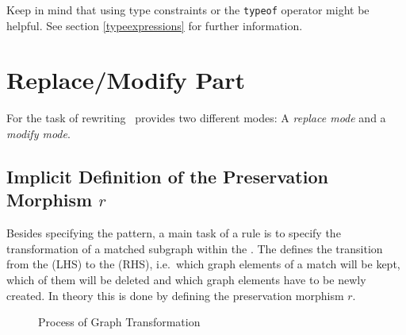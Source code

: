 Keep in mind that using type constraints or the \texttt{typeof} operator might be helpful. See section \ref{typeexpressions} for further information.

\section{Replace/Modify Part}
\label{replacepart}
For the task of rewriting \GrG\ provides two different modes: A \emph{replace mode} and a \emph{modify mode}.

\subsection{Implicit Definition of the Preservation Morphism $r$}
\label{rule:morphismr}
Besides specifying the pattern, a main task of a rule is to specify the transformation of a matched subgraph within the . 
The  defines the transition from the  (LHS) to the  (RHS), i.e.\ which graph elements of a match will be kept, which of them will be deleted and which graph elements have to be newly created.
In theory this is done by defining the preservation morphism $r$.
\begin{figure}[htbp]
	\centering
  \caption{Process of Graph Transformation}
  \label{rule:figrule}
\end{figure}
